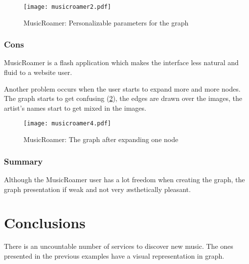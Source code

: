   \begin{figure}[tb]
    \begin{center}
      \texttt{[image: musicroamer2.pdf]}
    \end{center}
    \caption{MusicRoamer: Personalizable parameters for the graph }
    \label{fig:sota_musicroamer3}
  \end{figure}


  \subsubsection{Cons} %
  \label{ssub:cons}

  MusicRoamer is a flash application which makes the interface less natural and fluid to a website user.

  Another problem occurs when the user starts to expand more and more nodes.
  The graph starts to get confusing (\ref{fig:sota_musicroamer4}), the edges are drawn over the images, the artist's names start to get mixed in the images.

  \begin{figure}[tb]
    \begin{center}
      \texttt{[image: musicroamer4.pdf]}
    \end{center}
    \caption{MusicRoamer: The graph after expanding one node}
    \label{fig:sota_musicroamer4}
  \end{figure}


  \subsubsection{Summary} %
  \label{ssub:summary}

  Although the MusicRoamer user has a lot freedom when creating the graph, the graph presentation if weak and not very æsthetically pleasant.






\section{Conclusions}

There is an uncountable number of services to discover new music.
The ones presented in the previous examples have a visual representation in graph.

